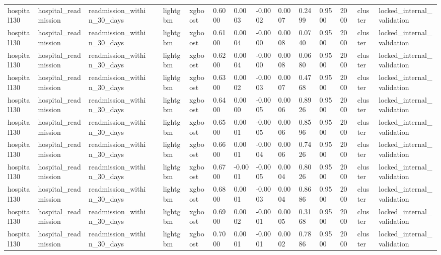 \begin{tabular}{lllllllllllllll}
hospital130 & hospital\_readmission & readmission\_within\_30\_days &  & lightgbm & xgboost & 0.6000 & 0.0003 & -0.0002 & 0.0007 & 0.2499 & 0.9500 & 2000 & cluster & locked\_internal\_validation \\
hospital130 & hospital\_readmission & readmission\_within\_30\_days &  & lightgbm & xgboost & 0.6100 & 0.0004 & -0.0000 & 0.0008 & 0.0740 & 0.9500 & 2000 & cluster & locked\_internal\_validation \\
hospital130 & hospital\_readmission & readmission\_within\_30\_days &  & lightgbm & xgboost & 0.6200 & 0.0004 & -0.0000 & 0.0008 & 0.0680 & 0.9500 & 2000 & cluster & locked\_internal\_validation \\
hospital130 & hospital\_readmission & readmission\_within\_30\_days &  & lightgbm & xgboost & 0.6300 & 0.0002 & -0.0003 & 0.0007 & 0.4768 & 0.9500 & 2000 & cluster & locked\_internal\_validation \\
hospital130 & hospital\_readmission & readmission\_within\_30\_days &  & lightgbm & xgboost & 0.6400 & 0.0000 & -0.0005 & 0.0006 & 0.8926 & 0.9500 & 2000 & cluster & locked\_internal\_validation \\
hospital130 & hospital\_readmission & readmission\_within\_30\_days &  & lightgbm & xgboost & 0.6500 & 0.0001 & -0.0005 & 0.0006 & 0.8596 & 0.9500 & 2000 & cluster & locked\_internal\_validation \\
hospital130 & hospital\_readmission & readmission\_within\_30\_days &  & lightgbm & xgboost & 0.6600 & 0.0001 & -0.0004 & 0.0006 & 0.7426 & 0.9500 & 2000 & cluster & locked\_internal\_validation \\
hospital130 & hospital\_readmission & readmission\_within\_30\_days &  & lightgbm & xgboost & 0.6700 & -0.0001 & -0.0005 & 0.0004 & 0.8026 & 0.9500 & 2000 & cluster & locked\_internal\_validation \\
hospital130 & hospital\_readmission & readmission\_within\_30\_days &  & lightgbm & xgboost & 0.6800 & 0.0001 & -0.0003 & 0.0004 & 0.8686 & 0.9500 & 2000 & cluster & locked\_internal\_validation \\
hospital130 & hospital\_readmission & readmission\_within\_30\_days &  & lightgbm & xgboost & 0.6900 & 0.0002 & -0.0001 & 0.0005 & 0.3168 & 0.9500 & 2000 & cluster & locked\_internal\_validation \\
hospital130 & hospital\_readmission & readmission\_within\_30\_days &  & lightgbm & xgboost & 0.7000 & 0.0001 & -0.0001 & 0.0002 & 0.7886 & 0.9500 & 2000 & cluster & locked\_internal\_validation \\

\end{tabular}
